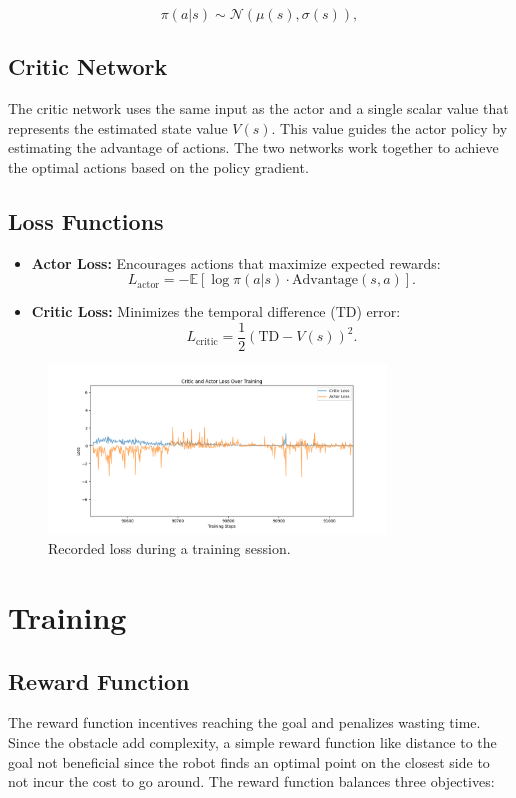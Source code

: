 \documentclass[12pt]{article}
\begin{document}
\begin{equation}
\pi(a|s) \sim \mathcal{N}(\mu(s), \sigma(s)),
\end{equation}

\subsection{Critic Network}
The critic network uses the same input as the actor and a single scalar value that represents the estimated state value \(V(s)\). This value guides the actor policy by estimating the advantage of actions. The two networks work together to achieve the optimal actions based on the policy gradient.

\subsection{Loss Functions}
\begin{itemize}
    \item \textbf{Actor Loss:} Encourages actions that maximize expected rewards:
    \[
    L_\text{actor} = -\mathbb{E}[\log\pi(a|s) \cdot \text{Advantage}(s, a)].
    \]
    \item \textbf{Critic Loss:} Minimizes the temporal difference (TD) error:
    \[
    L_\text{critic} = \frac{1}{2} (\text{TD} - V(s))^2.
    \]
\end{itemize}

\begin{figure}[H]
    \centering
    \includegraphics[width=0.8\textwidth]{report/images/loss.png}
    \caption{Recorded loss during a training session.}
    \label{fig:trajectory}
\end{figure}

\section{Training}

\subsection{Reward Function}
The reward function incentives reaching the goal and penalizes wasting time. Since the obstacle add complexity, a simple reward function like distance to the goal not beneficial since the robot finds an optimal point on the closest side to not incur the cost to go around. The reward function balances three objectives:
\end{document}
